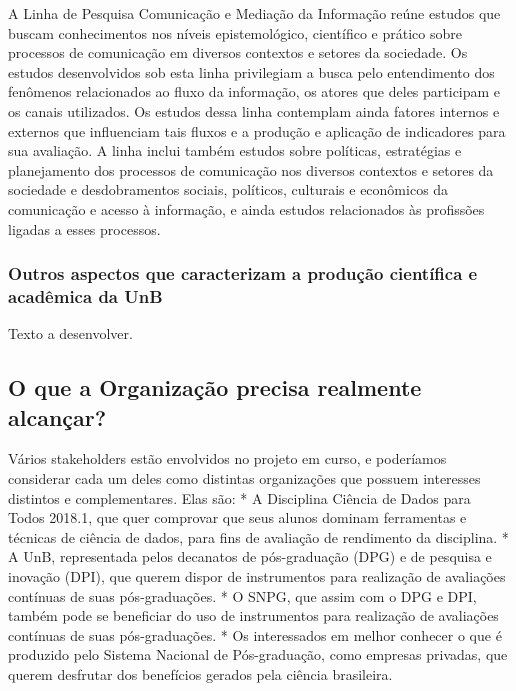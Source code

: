 \documentclass[]{article}
\begin{document}
A Linha de Pesquisa Comunicação e Mediação da Informação reúne estudos
que buscam conhecimentos nos níveis epistemológico, científico e prático
sobre processos de comunicação em diversos contextos e setores da
sociedade. Os estudos desenvolvidos sob esta linha privilegiam a busca
pelo entendimento dos fenômenos relacionados ao fluxo da informação, os
atores que deles participam e os canais utilizados. Os estudos dessa
linha contemplam ainda fatores internos e externos que influenciam tais
fluxos e a produção e aplicação de indicadores para sua avaliação. A
linha inclui também estudos sobre políticas, estratégias e planejamento
dos processos de comunicação nos diversos contextos e setores da
sociedade e desdobramentos sociais, políticos, culturais e econômicos da
comunicação e acesso à informação, e ainda estudos relacionados às
profissões ligadas a esses processos.

\subsubsection{Outros aspectos que caracterizam a produção científica e
acadêmica da
UnB}\label{outros-aspectos-que-caracterizam-a-producao-cientifica-e-academica-da-unb}

Texto a desenvolver.

\subsection{O que a Organização precisa realmente
alcançar?}\label{o-que-a-organizacao-precisa-realmente-alcancar}

Vários stakeholders estão envolvidos no projeto em curso, e poderíamos
considerar cada um deles como distintas organizações que possuem
interesses distintos e complementares. Elas são: * A Disciplina Ciência
de Dados para Todos 2018.1, que quer comprovar que seus alunos dominam
ferramentas e técnicas de ciência de dados, para fins de avaliação de
rendimento da disciplina. * A UnB, representada pelos decanatos de
pós-graduação (DPG) e de pesquisa e inovação (DPI), que querem dispor de
instrumentos para realização de avaliações contínuas de suas
pós-graduações. * O SNPG, que assim com o DPG e DPI, também pode se
beneficiar do uso de instrumentos para realização de avaliações
contínuas de suas pós-graduações. * Os interessados em melhor conhecer o
que é produzido pelo Sistema Nacional de Pós-graduação, como empresas
privadas, que querem desfrutar dos benefícios gerados pela ciência
brasileira.
\end{document}
